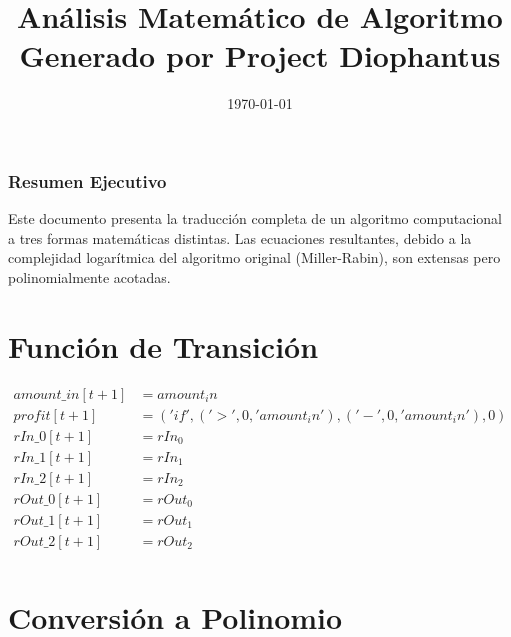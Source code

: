 \documentclass[10pt, a4paper]{article}
\title{Análisis Matemático de Algoritmo \\ \large Generado por Project Diophantus}
\author{}
\date{\today}
\begin{document}
\maketitle
\section*{Resumen Ejecutivo}
Este documento presenta la traducción completa de un algoritmo computacional a tres formas matemáticas distintas.
Las ecuaciones resultantes, debido a la complejidad logarítmica del algoritmo original (Miller-Rabin), son extensas pero polinomialmente acotadas.
\part{Función de Transición}
\begin{align*}
amount\_in[t+1] &= amount_in \\
profit[t+1] &= ('if', ('>', 0, 'amount_in'), ('-', 0, 'amount_in'), 0) \\
rIn\_0[t+1] &= rIn_0 \\
rIn\_1[t+1] &= rIn_1 \\
rIn\_2[t+1] &= rIn_2 \\
rOut\_0[t+1] &= rOut_0 \\
rOut\_1[t+1] &= rOut_1 \\
rOut\_2[t+1] &= rOut_2 \\
\end{align*}\part{Conversión a Polinomio}
\end{document}

